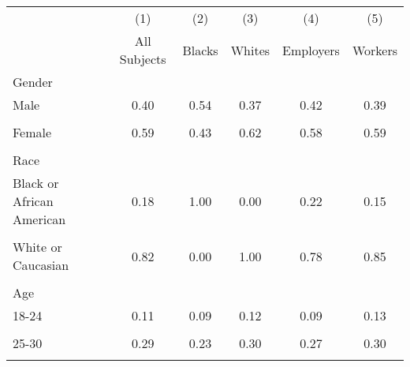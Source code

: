 \begin{tabular*}{\hsize}{@{\hskip\tabcolsep\extracolsep\fill}l*{5}{c}} \hline\hline
                    &\multicolumn{1}{c}{(1)}&\multicolumn{1}{c}{(2)}&\multicolumn{1}{c}{(3)}&\multicolumn{1}{c}{(4)}&\multicolumn{1}{c}{(5)}\\
                    &\multicolumn{1}{c}{All Subjects}&\multicolumn{1}{c}{Blacks}&\multicolumn{1}{c}{Whites}&\multicolumn{1}{c}{Employers}&\multicolumn{1}{c}{Workers}\\
\hline
Gender              &            &            &            &            &            \\
\hspace{0.5cm}Male  &        0.40&        0.54&        0.37&        0.42&        0.39\\
                    &            &            &            &            &            \\
\hspace{0.5cm}Female&        0.59&        0.43&        0.62&        0.58&        0.59\\
                    &            &            &            &            &            \\
Race                &            &            &            &            &            \\
\hspace{0.5cm}Black or African American&        0.18&        1.00&        0.00&        0.22&        0.15\\
                    &            &            &            &            &            \\
\hspace{0.5cm}White or Caucasian&        0.82&        0.00&        1.00&        0.78&        0.85\\
                    &            &            &            &            &            \\
Age                 &            &            &            &            &            \\
\hspace{0.5cm}18-24 &        0.11&        0.09&        0.12&        0.09&        0.13\\
                    &            &            &            &            &            \\
\hspace{0.5cm}25-30 &        0.29&        0.23&        0.30&        0.27&        0.30\\
                    &            &            &            &            &            \\

\end{tabular*}
